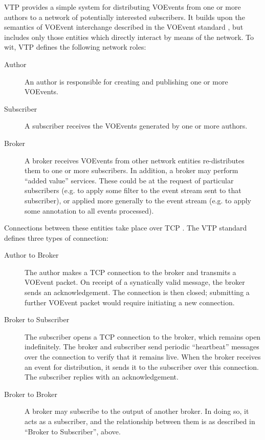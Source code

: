 \documentclass[5p,authoryear]{elsarticle}
\begin{document}
VTP provides a simple system for distributing VOEvents from one or more
authors to a network of potentially interested subscribers. It builds upon the
semantics of VOEvent interchange described in the VOEvent standard
\citep{Seaman:2011}, but includes only those entities which directly interact
by means of the network. To wit, VTP defines the following network roles:

\begin{description}

  \item[Author]{An author is responsible for creating and publishing one or
  more VOEvents.}

  \item[Subscriber]{A subscriber receives the VOEvents generated by one or
  more authors.}

  \item[Broker]{A broker receives VOEvents from other network entities
  re-distributes them to one or more subscribers. In addition, a broker may
  perform ``added value'' services. These could be at the request of
  particular subscribers (e.g. to apply some filter to the event stream sent
  to that subscriber), or applied more generally to the event stream (e.g. to
  apply some annotation to all events processed).}

\end{description}

Connections between these entities take place over TCP \citep{Cerf:1974}. The
VTP standard defines three types of connection:

\begin{description}

  \item[Author to Broker]{The author makes a TCP connection to the broker and
  transmits a VOEvent packet. On receipt of a synatically valid message, the
  broker sends an acknowledgement.  The connection is then closed; submitting
  a further VOEvent packet would require initiating a new connection.}

  \item[Broker to Subscriber]{The subscriber opens a TCP connection to the
  broker, which remains open indefinitely. The broker and subscriber send
  periodic ``heartbeat'' messages over the connection to verify that it
  remains live.  When the broker receives an event for distribution, it sends
  it to the subscriber over this connection. The subscriber replies with an
  acknowledgement.}

  \item[Broker to Broker]{A broker may subscribe to the output of another
  broker. In doing so, it acts as a subscriber, and the relationship between
  them is as described in ``Broker to Subscriber'', above.}

\end{description}
\end{document}
